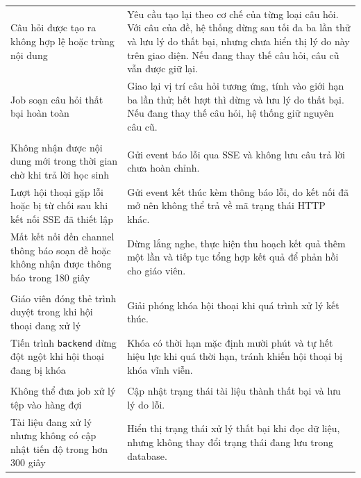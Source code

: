 \begin{longtable}{@{}L{5.6cm}L{9.0cm}@{}}
Câu hỏi được tạo ra không hợp lệ hoặc trùng nội dung &
Yêu cầu tạo lại theo cơ chế của từng loại câu hỏi. Với câu của đề, hệ thống dừng sau tối đa ba lần thử và lưu lý do thất bại, nhưng chưa hiển thị lý do này trên giao diện. Nếu đang thay thế câu hỏi, câu cũ vẫn được giữ lại. \\

Job soạn câu hỏi thất bại hoàn toàn &
Giao lại vị trí câu hỏi tương ứng, tính vào giới hạn ba lần thử; hết lượt thì dừng và lưu lý do thất bại. Nếu đang thay thế câu hỏi, hệ thống giữ nguyên câu cũ. \\
\addlinespace

 \\
\addlinespace

Không nhận được nội dung mới trong thời gian chờ khi trả lời học sinh &
Gửi event báo lỗi qua SSE và không lưu câu trả lời chưa hoàn chỉnh. \\

Lượt hội thoại gặp lỗi hoặc bị từ chối sau khi kết nối SSE đã thiết lập &
Gửi event kết thúc kèm thông báo lỗi, do kết nối đã mở nên không thể trả về mã trạng thái HTTP khác. \\

Mất kết nối đến channel thông báo soạn đề hoặc không nhận được thông báo trong 180 giây &
Dừng lắng nghe, thực hiện thu hoạch kết quả thêm một lần và tiếp tục tổng hợp kết quả để phản hồi cho giáo viên. \\
\addlinespace

 \\
\addlinespace

Giáo viên đóng thẻ trình duyệt trong khi hội thoại đang xử lý &
Giải phóng khóa hội thoại khi quá trình xử lý kết thúc. \\

Tiến trình \texttt{backend} dừng đột ngột khi hội thoại đang bị khóa &
Khóa có thời hạn mặc định mười phút và tự hết hiệu lực khi quá thời hạn, tránh khiến hội thoại bị khóa vĩnh viễn. \\
\addlinespace

 \\
\addlinespace

Không thể đưa job xử lý tệp vào hàng đợi &
Cập nhật trạng thái tài liệu thành thất bại và lưu lý do lỗi. \\

Tài liệu đang xử lý nhưng không có cập nhật tiến độ trong hơn 300 giây &
Hiển thị trạng thái xử lý thất bại khi đọc dữ liệu, nhưng không thay đổi trạng thái đang lưu trong database. \\

\end{longtable}

